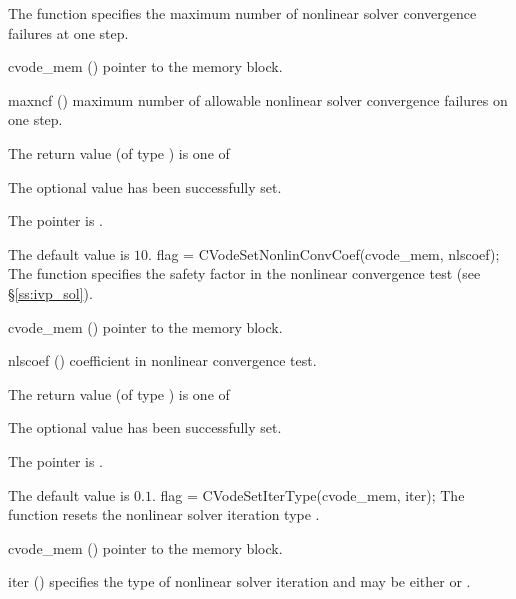 {
  The function  specifies the
  maximum number of nonlinear solver convergence failures at one step.
}
{
  \begin{args}
  \item[cvode\_mem] ()
    pointer to the {\cvode} memory block.
  \item[maxncf] ()
    maximum number of allowable nonlinear solver convergence failures
    on one step.
  \end{args}
}
{
  The return value  (of type ) is one of
  \begin{args}
  \item[\Id{CV\_SUCCESS}] 
    The optional value has been successfully set.
  \item[\Id{CV\_MEM\_NULL}]
    The  pointer is .
  \end{args}
}
{
  The default value is $10$.
}
{
flag = CVodeSetNonlinConvCoef(cvode\_mem, nlscoef);
}
{
  The function  specifies the safety factor
  in the nonlinear convergence test (see \S\ref{ss:ivp_sol}).
}
{
  \begin{args}
  \item[cvode\_mem] ()
    pointer to the {\cvode} memory block.
  \item[nlscoef] ()
    coefficient in nonlinear convergence test.
  \end{args}
}
{
  The return value  (of type ) is one of
  \begin{args}
  \item[\Id{CV\_SUCCESS}] 
    The optional value has been successfully set.
  \item[\Id{CV\_MEM\_NULL}]
    The  pointer is .
  \end{args}
}
{
  The default value is $0.1$.
}
{
flag = CVodeSetIterType(cvode\_mem, iter);
}
{
  The function  resets the nonlinear solver
  iteration type .
}
{
  \begin{args}
  \item[cvode\_mem] ()
    pointer to the {\cvode} memory block.
  \item[iter] ()
    specifies the type of nonlinear solver iteration and may be
    either  or . 
  \end{args}
}
